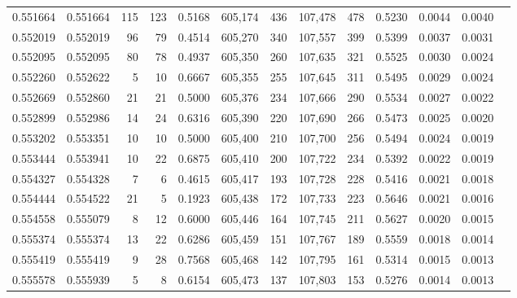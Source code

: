 \begin{tabular}{rrrrrrrrrrrrr}
0.551664 & 0.551664 &   115 &   123 &                                     0.5168 & 605,174 &     436 & 107,478 &     478 & 0.5230 & 0.0044 & 0.0040 \\
0.552019 & 0.552019 &    96 &    79 &                                     0.4514 & 605,270 &     340 & 107,557 &     399 & 0.5399 & 0.0037 & 0.0031 \\
0.552095 & 0.552095 &    80 &    78 &                                     0.4937 & 605,350 &     260 & 107,635 &     321 & 0.5525 & 0.0030 & 0.0024 \\
0.552260 & 0.552622 &     5 &    10 &                                     0.6667 & 605,355 &     255 & 107,645 &     311 & 0.5495 & 0.0029 & 0.0024 \\
0.552669 & 0.552860 &    21 &    21 &                                     0.5000 & 605,376 &     234 & 107,666 &     290 & 0.5534 & 0.0027 & 0.0022 \\
0.552899 & 0.552986 &    14 &    24 &                                     0.6316 & 605,390 &     220 & 107,690 &     266 & 0.5473 & 0.0025 & 0.0020 \\
0.553202 & 0.553351 &    10 &    10 &                                     0.5000 & 605,400 &     210 & 107,700 &     256 & 0.5494 & 0.0024 & 0.0019 \\
0.553444 & 0.553941 &    10 &    22 &                                     0.6875 & 605,410 &     200 & 107,722 &     234 & 0.5392 & 0.0022 & 0.0019 \\
0.554327 & 0.554328 &     7 &     6 &                                     0.4615 & 605,417 &     193 & 107,728 &     228 & 0.5416 & 0.0021 & 0.0018 \\
0.554444 & 0.554522 &    21 &     5 &                                     0.1923 & 605,438 &     172 & 107,733 &     223 & 0.5646 & 0.0021 & 0.0016 \\
0.554558 & 0.555079 &     8 &    12 &                                     0.6000 & 605,446 &     164 & 107,745 &     211 & 0.5627 & 0.0020 & 0.0015 \\
0.555374 & 0.555374 &    13 &    22 &                                     0.6286 & 605,459 &     151 & 107,767 &     189 & 0.5559 & 0.0018 & 0.0014 \\
0.555419 & 0.555419 &     9 &    28 &                                     0.7568 & 605,468 &     142 & 107,795 &     161 & 0.5314 & 0.0015 & 0.0013 \\
0.555578 & 0.555939 &     5 &     8 &                                     0.6154 & 605,473 &     137 & 107,803 &     153 & 0.5276 & 0.0014 & 0.0013 \\

\end{tabular}
